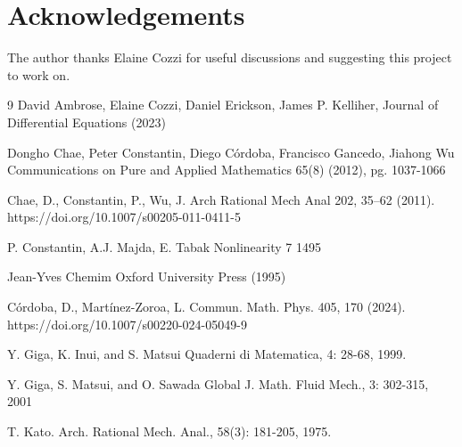 \documentclass[12pt,xcolor=svgnames]{amsart}
\begin{document}
\section*{Acknowledgements}
\noindent The author thanks Elaine Cozzi for useful discussions and suggesting this project to work on.     


\begin{thebibliography}{9}
David Ambrose, Elaine Cozzi, Daniel Erickson, James P. Kelliher,
\newblock  Journal of Differential Equations (2023) 

Dongho Chae, Peter Constantin, Diego Córdoba, Francisco Gancedo, Jiahong Wu
\newblock Communications on Pure and Applied Mathematics 65(8) (2012), pg. 1037-1066

 Chae, D., Constantin, P.,  Wu, J. 
\newblock Arch Rational Mech Anal 202, 35–62 (2011). https://doi.org/10.1007/s00205-011-0411-5

 P. Constantin, A.J. Majda, E. Tabak 
 Nonlinearity 7 1495

Jean-Yves Chemim
\newblock Oxford University Press (1995)

Córdoba, D., Martínez-Zoroa, L. 
 \newblock Commun. Math. Phys. 405, 170 (2024). https://doi.org/10.1007/s00220-024-05049-9

 Y. Giga, K. Inui, and S. Matsui
Quaderni di Matematica, 4: 28-68,
1999.

Y. Giga, S. Matsui, and O. Sawada Global 
\newblock J. Math. Fluid Mech., 3: 302-315,
2001
 
T. Kato. 
 \newblock Arch. Rational
Mech. Anal., 58(3): 181-205, 1975.


\end{thebibliography}
\end{document}
